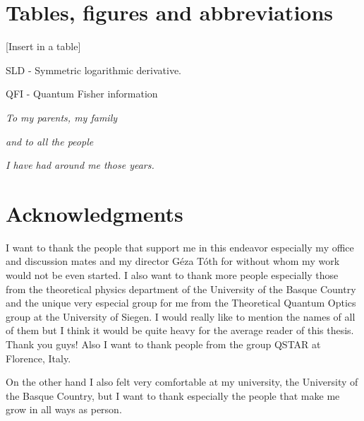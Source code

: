 \documentclass[12pt, letterpaper, twoside]{article}
\numberwithin{equation}{section}
\numberwithin{figure}{section}
\numberwithin{table}{section}
\begin{document}
\vspace*{100pt}
\tableofcontents

\section*{Tables, figures and abbreviations}
\fancyfoot[LE,RO]{\thepage}

[Insert in a table]

SLD - Symmetric logarithmic derivative.

QFI - Quantum Fisher information


\cleardoublepage

\fancyfoot{}

\cleardoublepage
\setcounter{page}{1}

\vspace*{100pt}
\begin{center}
\emph{To my parents, my family}

\emph{and to all the people}

\emph{I have had around me those years.}
\end{center}

\cleardoublepage

\section*{Acknowledgments}

I want to thank the people that support me in this endeavor especially my office and discussion mates and my director G\'eza T\'oth for without whom my work would not be even  started.
I also want to thank more people especially those from the theoretical physics department of the University of the Basque Country and the unique very especial group for me from the Theoretical Quantum Optics group at the University of Siegen.
I would really like to mention the names of all of them but I think it would be quite heavy for the average reader of this thesis.
Thank you guys!
Also I want to thank people from the group QSTAR at Florence, Italy.

On the other hand I also felt very comfortable at my university, the University of the Basque Country, but I want to thank especially the people that make me grow in all ways as person.
\end{document}

